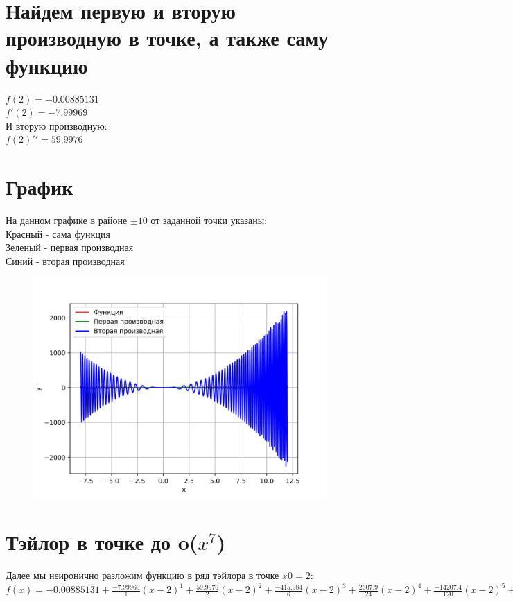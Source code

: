 \documentclass[a4paper]{article}
\begin{document}
\section{Найдем первую и вторую производную в точке, а также саму функцию}
$f(2) = -0.00885131$\\
$f\prime(2) = -7.99969 $\\
И вторую производную: \\ 
$f(2)\prime\prime = 59.9976$ \\
\section{График}
На данном графике в районе $\pm 10$ от заданной точки указаны: \\
Красный - сама функция \\
Зеленый - первая производная \\
Синий - вторая производная \\
\begin{figure}[H]
\centering
\includegraphics{graph.png}
\end{figure}\section{Тэйлор в точке до o($x^7$)}
Далее мы неиронично разложим функцию в ряд тэйлора в точке $x0 = 2$: \\
$f(x) = -0.00885131 + \frac{-7.99969}{1}(x-2)^{1} + \frac{59.9976}{2}(x-2)^{2} + \frac{-415.984}{6}(x-2)^{3} + \frac{2607.9}{24}(x-2)^{4} + \frac{-14207.4}{120}(x-2)^{5} + \frac{61501.6}{720}(x-2)^{6} + \frac{-151034}{5040}(x-2)^{7} + o(x^7)$
\end{document}
